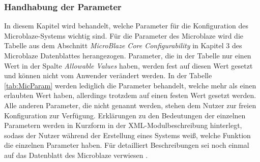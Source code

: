 \subsubsection{Handhabung der Parameter}
In diesem Kapitel wird behandelt, welche Parameter für die Konfiguration des Microblaze-Systems wichtig sind.
Für die Parameter des Microblaze wird die Tabelle aus dem Abschnitt \textit{MicroBlaze Core Configurability} in Kapitel 3 des Microblaze Datenblattes \cite{MBREF} herangezogen. Parameter, die in der Tabelle nur einen Wert in der Spalte \textit{Allowable Values} haben, werden fest auf diesen Wert gesetzt und können nicht vom Anwender verändert werden. In der Tabelle \ref{tab:MicParam} werden lediglich die Parameter behandelt, welche mehr als einen erlaubten Wert haben, allerdings trotzdem auf einen festen Wert gesetzt werden. Alle anderen Parameter, die nicht genannt werden, stehen dem Nutzer zur freien Konfiguration zur Verfügung. Erklärungen zu den Bedeutungen der einzelnen Parametern werden in Kurzform in der XML-Modulbeschreibung hinterlegt, sodass der Nutzer während der Erstellung eines Systems weiß, welche Funktion die einzelnen Parameter haben. Für detailliert Beschreibungen sei noch einmal auf das Datenblatt des Microblaze verwiesen \cite{MBREF}.
